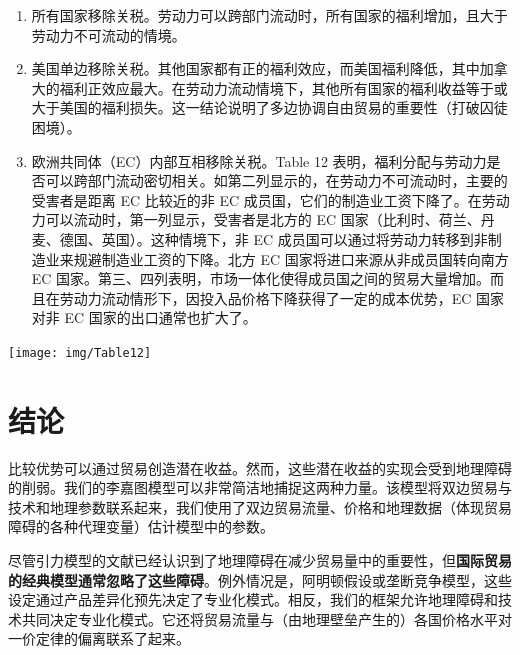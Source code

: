 \documentclass[
]{article}
\begin{document}
\begin{enumerate}
\def\labelenumi{\arabic{enumi}.}
\item
  所有国家移除关税。劳动力可以跨部门流动时，所有国家的福利增加，且大于劳动力不可流动的情境。
\item
  美国单边移除关税。其他国家都有正的福利效应，而美国福利降低，其中加拿大的福利正效应最大。在劳动力流动情境下，其他所有国家的福利收益等于或大于美国的福利损失。这一结论说明了多边协调自由贸易的重要性（打破囚徒困境）。
\item
  欧洲共同体（EC）内部互相移除关税。Table 12
  表明，福利分配与劳动力是否可以跨部门流动密切相关。如第二列显示的，在劳动力不可流动时，主要的受害者是距离
  EC 比较近的非 EC
  成员国，它们的制造业工资下降了。在劳动力可以流动时，第一列显示，受害者是北方的
  EC 国家（比利时、荷兰、丹麦、德国、英国）。这种情境下，非 EC
  成员国可以通过将劳动力转移到非制造业来规避制造业工资的下降。北方 EC
  国家将进口来源从非成员国转向南方 EC
  国家。第三、四列表明，市场一体化使得成员国之间的贸易大量增加。而且在劳动力流动情形下，因投入品价格下降获得了一定的成本优势，EC
  国家对非 EC 国家的出口通常也扩大了。
\end{enumerate}

\begin{center}\texttt{[image: img/Table12]} \end{center}

\hypertarget{ux7ed3ux8bba}{%
\section{结论}\label{ux7ed3ux8bba}}

比较优势可以通过贸易创造潜在收益。然而，这些潜在收益的实现会受到地理障碍的削弱。我们的李嘉图模型可以非常简洁地捕捉这两种力量。该模型将双边贸易与技术和地理参数联系起来，我们使用了双边贸易流量、价格和地理数据（体现贸易障碍的各种代理变量）估计模型中的参数。

尽管引力模型的文献已经认识到了地理障碍在减少贸易量中的重要性，但\textbf{国际贸易的经典模型通常忽略了这些障碍}。例外情况是，阿明顿假设或垄断竞争模型，这些设定通过产品差异化预先决定了专业化模式。相反，我们的框架允许地理障碍和技术共同决定专业化模式。它还将贸易流量与（由地理壁垒产生的）各国价格水平对一价定律的偏离联系了起来。

  
\end{document}
